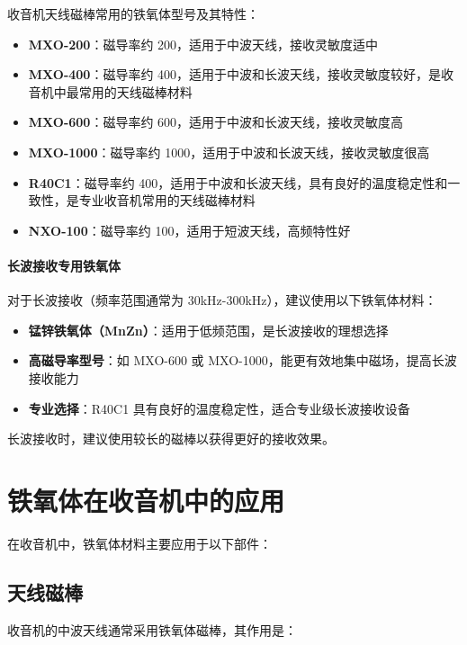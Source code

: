 \documentclass[12pt,UTF8]{ctexbook}
\begin{document}
收音机天线磁棒常用的铁氧体型号及其特性：

\begin{itemize}[leftmargin=2cm]
    \item \textbf{MXO-200}：磁导率约 200，适用于中波天线，接收灵敏度适中
    \item \textbf{MXO-400}：磁导率约 400，适用于中波和长波天线，接收灵敏度较好，是收音机中最常用的天线磁棒材料
    \item \textbf{MXO-600}：磁导率约 600，适用于中波和长波天线，接收灵敏度高
    \item \textbf{MXO-1000}：磁导率约 1000，适用于中波和长波天线，接收灵敏度很高
    \item \textbf{R40C1}：磁导率约 400，适用于中波和长波天线，具有良好的温度稳定性和一致性，是专业收音机常用的天线磁棒材料
    \item \textbf{NXO-100}：磁导率约 100，适用于短波天线，高频特性好
\end{itemize}

\paragraph{长波接收专用铁氧体}

对于长波接收（频率范围通常为 30kHz-300kHz），建议使用以下铁氧体材料：

\begin{itemize}[leftmargin=2cm]
    \item \textbf{锰锌铁氧体（MnZn）}：适用于低频范围，是长波接收的理想选择
    \item \textbf{高磁导率型号}：如 MXO-600 或 MXO-1000，能更有效地集中磁场，提高长波接收能力
    \item \textbf{专业选择}：R40C1 具有良好的温度稳定性，适合专业级长波接收设备
\end{itemize}

长波接收时，建议使用较长的磁棒以获得更好的接收效果。

\section{铁氧体在收音机中的应用}

在收音机中，铁氧体材料主要应用于以下部件：

\subsection{天线磁棒}

收音机的中波天线通常采用铁氧体磁棒，其作用是：
\end{document}
